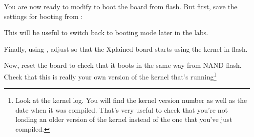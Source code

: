 {You are now ready to modify  to boot the board
from flash. But first, save the settings for booting from :


This will be useful to switch back to  booting mode
later in the labs.

Finally, using ,
adjust  so that the Xplained board starts
using the kernel in flash.

Now, reset the board to check that it boots
in the same way from NAND flash. Check that this is really your own version of
the kernel that's running\footnote{Look at the kernel log. You will find
the kernel version number as well as the date when it was compiled.
That's very useful to check that you're not loading an older version
of the kernel instead of the one that you've just compiled.}
}
{}
